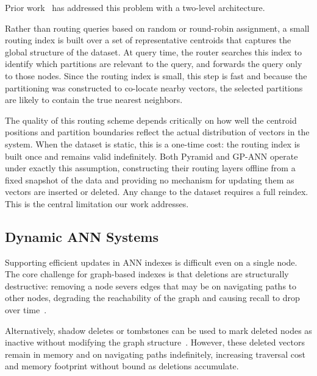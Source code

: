 \documentclass[sigconf,review,anonymous]{acmart}
\begin{document}
    Prior work~\cite{deng2019pyramid, gottesbueren2025unleashing} has addressed this problem with a two-level architecture.

    Rather than routing queries based on random or round-robin assignment, a small routing index is built over a set of representative centroids that captures the global structure of the dataset. At query time, the router searches this index to identify which partitions are relevant to the query, and forwards the query only to those nodes. Since the routing index is small, this step is fast and because the partitioning was constructed to co-locate nearby vectors, the selected partitions are likely to contain the true nearest neighbors.

    The quality of this routing scheme depends critically on how well the centroid positions and partition boundaries reflect the actual distribution of vectors in the system. When the dataset is static, this is a one-time cost: the routing index is built once and remains valid indefinitely. Both Pyramid and GP-ANN operate under exactly this assumption, constructing their routing layers offline from a fixed snapshot of the data and providing no mechanism for updating them as vectors are inserted or deleted. Any change to the dataset requires a full reindex. This is the central limitation our work addresses.

\subsection{Dynamic ANN Systems}
\label{sec:dynamic-ann}
    Supporting efficient updates in ANN indexes is difficult even on a single node. The core challenge for graph-based indexes is that deletions are structurally destructive: removing a node severs edges that may be on navigating paths to other nodes, degrading the reachability of the graph and causing recall to drop over time~\cite{singh2021freshdiskann, yu2025topology, xiao2024enhancing, xu2025place}.
    
    Alternatively, shadow deletes or tombstones can be used to mark deleted nodes as inactive without modifying the graph structure~\cite{malkov2018efficient, singh2021freshdiskann}. However, these deleted vectors remain in memory and on navigating paths indefinitely, increasing traversal cost and memory footprint without bound as deletions accumulate.
\end{document}
